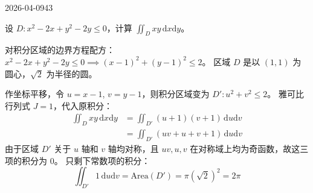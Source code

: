 \begin{mistake}{2026-04-09}{43}

\begin{problemcontent}
设 \( D: x^2 - 2x + y^2 - 2y \leqslant 0 \)，计算 \(\iint_D xy\,\mathrm{d}x\mathrm{d}y\)。
\end{problemcontent}

\begin{solutioncontent}
对积分区域的边界方程配方：
\( x^2 - 2x + y^2 - 2y \leqslant 0 \implies (x-1)^2 + (y-1)^2 \leqslant 2 \)。
区域 \( D \) 是以 \( (1,1) \) 为圆心，\( \sqrt{2} \) 为半径的圆。

作坐标平移，令 \( u = x-1 \), \( v = y-1 \)，则积分区域变为 \( D': u^2 + v^2 \leqslant 2 \)。
雅可比行列式 \( J = 1 \)，代入原积分：
\[
\begin{aligned}
\iint_D xy\,\mathrm{d}x\mathrm{d}y 
&= \iint_{D'} (u+1)(v+1)\,\mathrm{d}u\mathrm{d}v \\
&= \iint_{D'} (uv + u + v + 1)\,\mathrm{d}u\mathrm{d}v
\end{aligned}
\]
由于区域 \( D' \) 关于 \( u \) 轴和 \( v \) 轴均对称，且 \( uv, u, v \) 在对称域上均为奇函数，故这三项的积分为 0。
只剩下常数项的积分：
\[
\iint_{D'} 1\,\mathrm{d}u\mathrm{d}v = \text{Area}(D') = \pi(\sqrt{2})^2 = 2\pi
\]
\end{solutioncontent}


\end{mistake}
